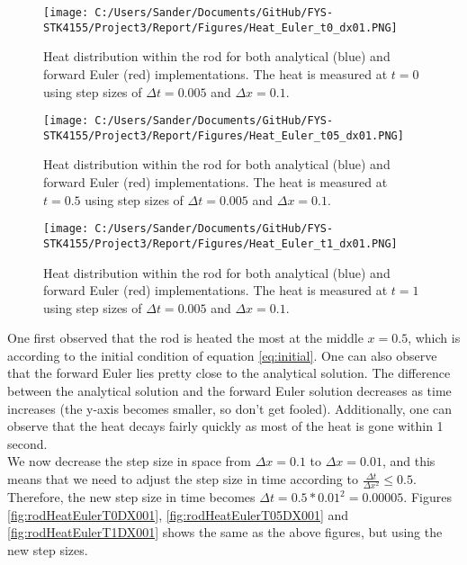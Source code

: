 \documentclass[12pt,a4paper]{article}
\begin{document}
\begin{figure}[H]
\centering
\texttt{[image: C:/Users/Sander/Documents/GitHub/FYS-STK4155/Project3/Report/Figures/Heat\_Euler\_t0\_dx01.PNG]}
\caption{\label{fig:rodHeatEulerT0DX01} Heat distribution within the rod for both analytical (blue) and forward Euler (red) implementations. The heat is measured at $t = 0$ using step sizes of $\Delta t = 0.005$ and $\Delta x = 0.1$.}
\end{figure}

\begin{figure}[H]
\centering
\texttt{[image: C:/Users/Sander/Documents/GitHub/FYS-STK4155/Project3/Report/Figures/Heat\_Euler\_t05\_dx01.PNG]}
\caption{\label{fig:rodHeatEulerT05DX01} Heat distribution within the rod for both analytical (blue) and forward Euler (red) implementations. The heat is measured at $t = 0.5$ using step sizes of $\Delta t = 0.005$ and $\Delta x = 0.1$.}
\end{figure}

\begin{figure}[H]
\centering
\texttt{[image: C:/Users/Sander/Documents/GitHub/FYS-STK4155/Project3/Report/Figures/Heat\_Euler\_t1\_dx01.PNG]}
\caption{\label{fig:rodHeatEulerT1DX01} Heat distribution within the rod for both analytical (blue) and forward Euler (red) implementations. The heat is measured at $t = 1$ using step sizes of $\Delta t = 0.005$ and $\Delta x = 0.1$.}
\end{figure}

\noindent One first observed that the rod is heated the most at the middle $x = 0.5$, which is according to the initial condition of equation \ref{eq:initial}. One can also observe that the forward Euler lies pretty close to the analytical solution. The difference between the analytical solution and the forward Euler solution decreases as time increases (the y-axis becomes smaller, so don't get fooled). Additionally, one can observe that the heat decays fairly quickly as most of the heat is gone within 1 second. 
\\
We now decrease the step size in space from $\Delta x = 0.1$ to $\Delta x = 0.01$, and this means that we need to adjust the step size in time according to $\frac{\Delta t}{\Delta x^2} \leq 0.5$. Therefore, the new step size in time becomes $\Delta t = 0.5*0.01^2 = 0.00005$. Figures \ref{fig:rodHeatEulerT0DX001}, \ref{fig:rodHeatEulerT05DX001} and \ref{fig:rodHeatEulerT1DX001} shows the same as the above figures, but using the new step sizes.
\end{document}
